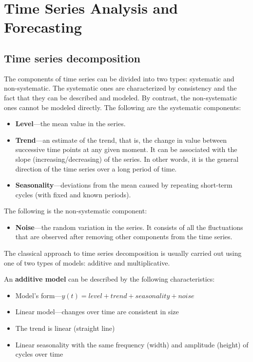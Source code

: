 \chapter{Time Series Analysis and Forecasting\label{ch06}}
\section{Time series decomposition}
The components of time series can be divided into two types: systematic and non-systematic. The
systematic ones are characterized by consistency and the fact that they can be described and modeled.
By contrast, the non-systematic ones cannot be modeled directly.
The following are the systematic components:
\begin{itemize}
    \item \textbf{Level}—the mean value in the series.
    \item \textbf{Trend}—an estimate of the trend, that is, the change in value between successive time points at any given moment. It can be associated with the slope (increasing/decreasing) of the series. In other words, it is the general direction of the time series over a long period of time.
    \item \textbf{Seasonality}—deviations from the mean caused by repeating short-term cycles (with fixed and
          known periods).
\end{itemize}
The following is the non-systematic component:
\begin{itemize}
    \item \textbf{Noise}—the random variation in the series. It consists of all the fluctuations that are observed after removing other components from the time series.
\end{itemize}
The classical approach to time series decomposition is usually carried out using one of two types of models: additive and multiplicative.

An \textbf{additive model} can be described by the following characteristics:
\begin{itemize}
    \item Model's form—$y(t) = level + trend + seasonality + noise$
    \item Linear model—changes over time are consistent in size
    \item The trend is linear (straight line)
    \item Linear seasonality with the same frequency (width) and amplitude (height) of cycles over time
\end{itemize}


